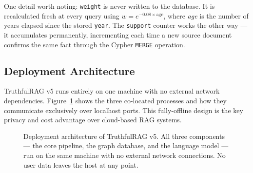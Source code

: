 One detail worth noting: \texttt{weight} is never written to the database.
It is recalculated fresh at every query using $w = e^{-0.08 \times \text{age}}$,
where \emph{age} is the number of years elapsed since the stored \texttt{year}.
The \texttt{support} counter works the other way --- it accumulates
permanently, incrementing each time a new source document confirms the same
fact through the Cypher \texttt{MERGE} operation.

\subsection{Deployment Architecture}

TruthfulRAG v5 runs entirely on one machine with no external network
dependencies. Figure~\ref{fig:deploy} shows the three co-located
processes and how they communicate exclusively over localhost ports.
This fully-offline design is the key privacy and cost advantage over
cloud-based RAG systems.

\begin{figure}[H]
\centering
{}
\caption{Deployment architecture of TruthfulRAG v5. All three components ---
the core pipeline, the graph database, and the language model ---
run on the same machine with no external network connections.
No user data leaves the host at any point.}
\label{fig:deploy}
\end{figure}

